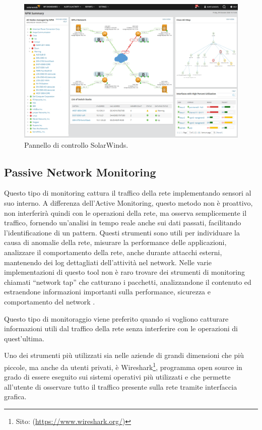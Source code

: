         \begin{figure}[H]
            \centering
            \includegraphics[width=1.0\textwidth]{Immagini/solar_wind_dashboard.png}
            \caption{Pannello di controllo SolarWinds.}
            \label{fig:solarwinds_dashboard}
        \end{figure}

    \subsection{Passive Network Monitoring}
        Questo tipo di monitoring cattura il traffico della rete implementando sensori al suo interno. A differenza dell'Active Monitoring, questo metodo non è proattivo, non interferirà quindi con le operazioni della rete, ma osserva semplicemente il traffico, fornendo un'analisi in tempo reale anche sui dati passati, facilitando l'identificazione di un pattern. Questi strumenti sono utili per individuare la causa di anomalie della rete, misurare la performance delle applicazioni, analizzare il comportamento della rete, anche durante attacchi esterni, mantenendo dei log dettagliati dell'attività nel network. Nelle varie implementazioni di questo tool non è raro trovare dei strumenti di monitoring chiamati “network tap” che catturano i pacchetti, analizzandone il contenuto ed estraendone informazioni importanti sulla performance, sicurezza e comportamento del network \cite{obkio_net_monitors}.

        Questo tipo di monitoraggio viene preferito quando si vogliono catturare informazioni utili dal traffico della rete senza interferire con le operazioni di quest'ultima.

        Uno dei strumenti più utilizzati sia nelle aziende di grandi dimensioni che più piccole, ma anche da utenti privati, è Wireshark\footnote{\label{wireshark_site}Sito: (\url{https://www.wireshark.org/})}, programma open source in grado di essere eseguito sui sistemi operativi più utilizzati e che permette all'utente di osservare tutto il traffico presente sulla rete tramite interfaccia grafica.

